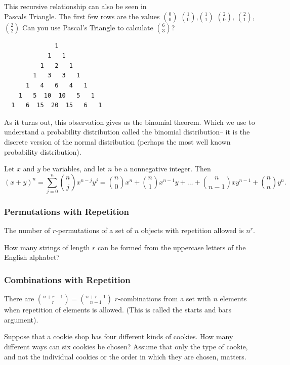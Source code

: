 \begin{exmp}
This recursive relationship can also be seen in\\
Pascals Triangle. The first few rows are the values
\newline
$\binom{0}{0}$
\newline
$\binom{1}{0}$,$\binom{1}{1}$
\newline
$\binom{2}{0}$, $\binom{2}{1}$,$\binom{2}{2}$
\newline
Can you use Pascal's Triangle to calculate $\binom{6}{3}$?

\begin{verbatim}
              1
            1   1
          1   2   1
        1   3   3   1
      1   4   6   4   1
    1   5  10  10   5   1
  1   6  15  20  15   6   1
\end{verbatim}
\end{exmp}
As it turns out, this observation gives us the binomial theorem. Which we use to understand a probability distribution called the binomial distribution-- it is the discrete version of the normal distribution (perhaps the most well known probability distribution).
\begin{thm}
    Let \(x\) and \(y\) be variables, and let \(n\) be a nonnegative integer. Then
    \[
    (x + y)^n = \sum_{j=0}^{n} \binom{n}{j} x^{n-j}y^j = \binom{n}{0}x^n + \binom{n}{1}x^{n-1}y + \ldots + \binom{n}{n-1}xy^{n-1} + \binom{n}{n}y^n.
    \]
\end{thm}

\subsubsection{Permutations with Repetition}
\begin{thm}
    The number of $r$-permutations of a set of $n$ objects with repetition allowed is $n^r$.
\end{thm}
\begin{exmp}
    How many strings of length $r$ can be formed from the uppercase letters of the English alphabet?
\vspace{3cm}
\end{exmp}
\subsubsection{Combinations with Repetition}
\begin{thm}
    There are $\binom{n + r - 1}{r} = \binom{n + r - 1}{n - 1}$ $r$-combinations from a set with $n$ elements when repetition of elements is allowed. (This is called the starts and bars argument).
\end{thm}
\begin{exmp}
    Suppose that a cookie shop has four different kinds of cookies. How many different ways can six cookies be chosen? Assume that only the type of cookie, and not the individual cookies or the order in which they are chosen, matters.
\vspace{3cm}
\end{exmp}
